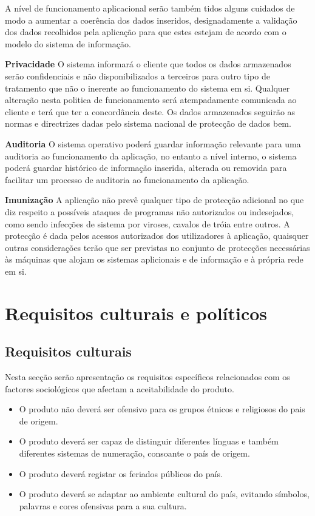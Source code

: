 A nível de funcionamento aplicacional serão também tidos alguns cuidados de modo a aumentar a coerência dos dados inseridos, designadamente a validação dos dados recolhidos pela aplicação para que estes estejam de acordo com o modelo do sistema de informação.

\textbf{Privacidade}
O sistema informará o cliente que todos os dados armazenados serão confidenciais e não disponibilizados a terceiros para outro tipo de tratamento que não o inerente ao funcionamento do sistema em si.
Qualquer alteração nesta politica de funcionamento será atempadamente comunicada ao cliente e terá que ter a concordância deste.
Os dados armazenados seguirão as normas e directrizes dadas pelo sistema nacional de protecção de dados bem.

\textbf{Auditoria}
O sistema operativo poderá guardar informação relevante para uma auditoria ao funcionamento da aplicação, no entanto a nível interno, o sistema poderá guardar histórico de informação inserida, alterada ou removida para facilitar um processo de auditoria ao funcionamento da aplicação.

\textbf{Imunização}
A aplicação não prevê qualquer tipo de protecção adicional no que diz respeito a possíveis ataques de programas não autorizados ou indesejados, como sendo infecções de sistema por viroses, cavalos de tróia entre outros. A protecção é dada pelos acessos autorizados dos utilizadores à aplicação, quaisquer outras considerações terão que ser previstas no conjunto de protecções necessárias às máquinas que alojam os sistemas aplicionais e de informação e à própria rede em si.

\section{Requisitos culturais e políticos}
\subsection{Requisitos culturais}
Nesta secção serão apresentação os requisitos específicos relacionados com os factores sociológicos que afectam a aceitabilidade do produto.
\begin{itemize}
\item O produto não deverá ser ofensivo para os grupos étnicos e religiosos do pais de origem.
\item O produto deverá ser capaz de distinguir diferentes línguas e também diferentes sistemas de numeração, consoante o país de origem.
\item O produto deverá registar os feriados públicos do país.
\item O produto deverá se adaptar ao ambiente cultural do país, evitando símbolos, palavras e cores ofensivas para a sua cultura.
\end{itemize}

